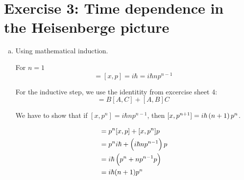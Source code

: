 \documentclass[a4paper,german,12pt,smallheadings]{scrartcl}
\begin{document}
\section*{Exercise 3: Time dependence in the Heisenberge picture}
\begin{enumerate}[a)]
  \item
    Using mathematical induction.

    For $n=1$
    \begin{equation*}
      [x,p^n] = [x,p] = i \hbar = i \hbar n p^{n-1}
    \end{equation*}

    For the inductive step, we use the identitity from excercise sheet 4:
    \begin{equation*}
      [A,BC] = B[A,C] + [A,B]C
    \end{equation*}

    We have to show that if $[x,p^n] = i \hbar n p^{n-1}$, then $[x,p^{n+1}] =
    i \hbar \del{n+1} p^n$.

    \begin{align*}
      [x,p^{n+1}] &= p^n[x,p] + [x,p^n]p \\
                  &= p^n i \hbar + \del{i \hbar n p^{n-1}} p \\
                  &= i \hbar \del{p^n + n p^{n-1} p} \\
                  &= i \hbar (n+1) p^n
    \end{align*}


\end{enumerate}
\end{document}
